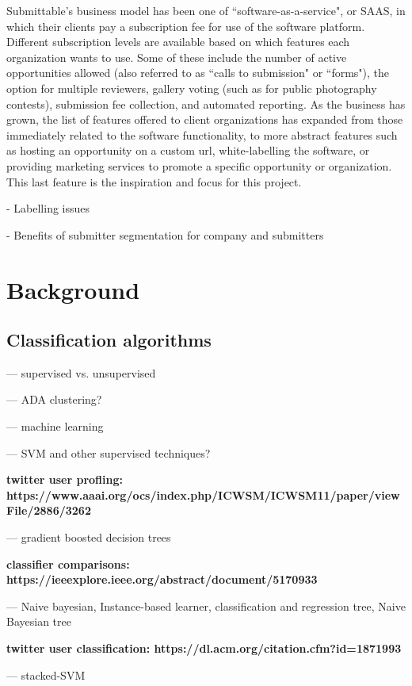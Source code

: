 \documentclass[]{report}   %
\begin{document}
Submittable's business model has been one of ``software-as-a-service", or SAAS, in which their clients pay a subscription fee for use of the software platform. Different subscription levels are available based on which features each organization wants to use. Some of these include the number of active opportunities allowed (also referred to as ``calls to submission" or ``forms"), the option for multiple reviewers, gallery voting (such as for public photography contests), submission fee collection, and automated reporting. As the business has grown, the list of features offered to client organizations has expanded from those immediately related to the software functionality, to more abstract features such as hosting an opportunity on a custom url, white-labelling the software, or providing marketing services to promote a specific opportunity or organization. This last feature is the inspiration and focus for this project.




            
- Labelling issues

- Benefits of submitter segmentation for company and submitters

\chapter{Background}
\section{Classification algorithms}

--- supervised vs. unsupervised

--- ADA clustering?

--- machine learning

--- SVM and other supervised techniques?

\textbf{twitter user profling: https://www.aaai.org/ocs/index.php/ICWSM/ICWSM11/paper/viewFile/2886/3262}

--- gradient boosted decision trees

\textbf{classifier comparisons: https://ieeexplore.ieee.org/abstract/document/5170933}

--- Naive bayesian, Instance-based learner, classification and regression tree, Naive Bayesian tree

\textbf{twitter user classification: https://dl.acm.org/citation.cfm?id=1871993}

--- stacked-SVM
\end{document}
